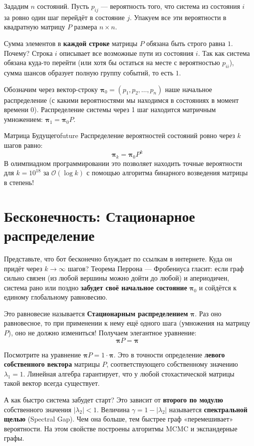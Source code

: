 \documentclass[12pt,a4paper]{article}
\begin{document}
Зададим $n$ состояний. Пусть $p_{ij}$ — вероятность того, что система из состояния $i$ за ровно один шаг перейдёт в состояние $j$. Упакуем все эти вероятности в квадратную матрицу $P$ размера $n \times n$.

\begin{insight}
Сумма элементов в \textbf{каждой строке} матрицы $P$ обязана быть строго равна $1$. 
Почему? Строка $i$ описывает все возможные пути из состояния $i$. Так как система обязана куда-то перейти (или хотя бы остаться на месте с вероятностью $p_{ii}$), сумма шансов образует полную группу событий, то есть $1$.
\end{insight}

Обозначим через вектор-строку $\bm{\pi}_0 = (p_1, p_2, \dots, p_n)$ наше начальное распределение (с какими вероятностями мы находимся в состояниях в момент времени $0$).
Распределение системы через 1 шаг находится матричным умножением: $\bm{\pi}_1 = \bm{\pi}_0 P$.

\begin{theorem}{Матрица Будущего}{future}
Распределение вероятностей состояний ровно через $k$ шагов равно:
\[ \bm{\pi}_k = \bm{\pi}_0 P^k \]
В олимпиадном программировании это позволяет находить точные вероятности для $k=10^{18}$ за $\mathcal{O}(\log k)$ с помощью алгоритма бинарного возведения матрицы в степень!
\end{theorem}

\newpage
\section{Бесконечность: Стационарное распределение}

Представьте, что бот бесконечно блуждает по ссылкам в интернете. Куда он придёт через $k \to \infty$ шагов? 
Теорема Перрона — Фробениуса гласит: если граф сильно связен (из любой вершины можно дойти до любой) и апериодичен, система рано или поздно \textbf{забудет своё начальное состояние} $\bm{\pi}_0$ и сойдётся к единому глобальному равновесию.

Это равновесие называется \textbf{Стационарным распределением} $\bm{\pi}$. Раз оно равновесное, то при применении к нему ещё одного шага (умножения на матрицу $P$), оно не должно измениться! Получаем элегантное уравнение:
\[ \bm{\pi} P = \bm{\pi} \]

\begin{paradox}
Посмотрите на уравнение $\bm{\pi} P = 1 \cdot \bm{\pi}$. 
Это в точности определение \textbf{левого собственного вектора} матрицы $P$, соответствующего собственному значению $\lambda_1 = 1$. Линейная алгебра гарантирует, что у любой стохастической матрицы такой вектор всегда существует.

А как быстро система забудет старт? Это зависит от \textbf{второго по модулю} собственного значения $|\lambda_2| < 1$. Величина $\gamma = 1 - |\lambda_2|$ называется \textbf{спектральной щелью} (Spectral Gap). Чем она больше, тем быстрее граф «перемешивает» вероятности. На этом свойстве построены алгоритмы MCMC и экспандерные графы.
\end{paradox}
\end{document}
